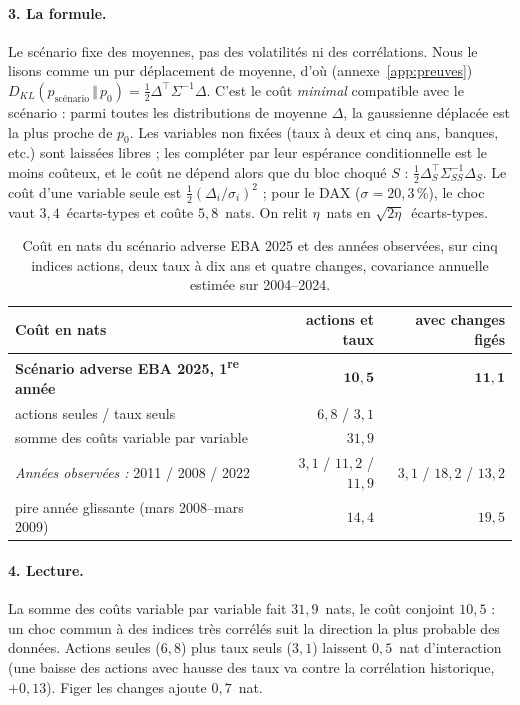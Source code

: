 \documentclass[11pt]{article}
\theoremstyle{definition}
\newcommand{\KL}[2]{D_{KL}\!\left(#1\,\Vert\,#2\right)}
\begin{document}
\paragraph{3. La formule.} Le scénario fixe des moyennes, pas des volatilités
ni des corrélations. Nous le lisons comme un pur déplacement de moyenne, d'où
(annexe~\ref{app:preuves}) $\KL{p_{\text{scénario}}}{p_0}=\tfrac12\Delta^\top
\Sigma^{-1}\Delta$. C'est le coût \emph{minimal} compatible avec le scénario :
parmi toutes les distributions de moyenne $\Delta$, la gaussienne déplacée est
la plus proche de $p_0$. Les variables non fixées (taux à deux et cinq ans,
banques, etc.) sont laissées libres ; les compléter par leur espérance
conditionnelle est le moins coûteux, et le coût ne dépend alors que du bloc
choqué $S$ : $\tfrac12\Delta_S^\top\Sigma_{SS}^{-1}\Delta_S$. Le coût d'une
variable seule est $\tfrac12(\Delta_i/\sigma_i)^2$ ; pour le DAX
($\sigma=20{,}3\,\%$), le choc vaut $3{,}4$~écarts-types et coûte
$5{,}8$~nats. On relit $\eta$~nats en $\sqrt{2\eta}$~écarts-types.

\begin{table}[t]
\centering
\small
\begin{tabular}{@{}lrr@{}}
\toprule
Coût en nats & actions et taux & avec changes figés \\
\midrule
\textbf{Scénario adverse EBA 2025, 1\textsuperscript{re} année} & $\mathbf{10{,}5}$ & $\mathbf{11{,}1}$ \\
\quad actions seules / taux seuls & $6{,}8$ / $3{,}1$ & \\
\quad somme des coûts variable par variable & $31{,}9$ & \\
\midrule
\emph{Années observées :} 2011 / 2008 / 2022 & $3{,}1$ / $11{,}2$ / $11{,}9$ & $3{,}1$ / $18{,}2$ / $13{,}2$ \\
\quad pire année glissante (mars 2008--mars 2009) & $14{,}4$ & $19{,}5$ \\
\bottomrule
\end{tabular}
\caption{Coût en nats du scénario adverse EBA 2025 et des années observées,
sur cinq indices actions, deux taux à dix ans et quatre changes, covariance
annuelle estimée sur 2004--2024.}
\label{tab:eba}
\end{table}

\paragraph{4. Lecture.} La somme des coûts variable par variable fait
$31{,}9$~nats, le coût conjoint $10{,}5$ : un choc commun à des indices très
corrélés suit la direction la plus probable des données. Actions seules
($6{,}8$) plus taux seuls ($3{,}1$) laissent $0{,}5$~nat d'interaction (une
baisse des actions avec hausse des taux va contre la corrélation historique,
$+0{,}13$). Figer les changes ajoute $0{,}7$~nat.
\end{document}
